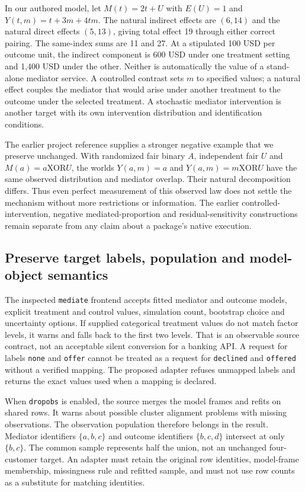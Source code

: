 In our authored model, let $M(t)=2t+U$ with $E(U)=1$ and
$Y(t,m)=t+3m+4tm$. The natural indirect effects are $(6,14)$ and the natural
direct effects $(5,13)$, giving total effect 19 through either correct pairing.
The same-index sums are 11 and 27. At a stipulated 100 USD per outcome unit,
the indirect component is 600 USD under one treatment setting and 1,400 USD
under the other. Neither is automatically the value of a stand-alone mediator
service. A controlled contrast sets $m$ to specified values; a natural effect
couples the mediator that would arise under another treatment to the outcome
under the selected treatment. A stochastic mediator intervention is another
target with its own intervention distribution and identification conditions.
\citep{exec24_mediation_contract}

The earlier project reference supplies a stronger negative example that we
preserve unchanged. With randomized fair binary $A$, independent fair $U$ and
$M(a)=a\mathbin{\mathrm{XOR}}U$, the worlds $Y(a,m)=a$ and
$Y(a,m)=m\mathbin{\mathrm{XOR}}U$ have the same observed distribution and
mediator overlap. Their natural decomposition differs. Thus even perfect
measurement of this observed law does not settle the mechanism without more
restrictions or information. The earlier controlled-intervention, negative
mediated-proportion and residual-sensitivity constructions remain separate
from any claim about a package's native execution.
\citep{exec20_med_reference}

\subsection{Preserve target labels, population and model-object semantics}
The inspected \texttt{mediate} frontend accepts fitted mediator and outcome
models, explicit treatment and control values, simulation count, bootstrap
choice and uncertainty options. If supplied categorical treatment values do
not match factor levels, it warns and falls back to the first two levels.
That is an observable source contract, not an acceptable silent conversion
for a banking API. A request for labels \texttt{none} and \texttt{offer}
cannot be treated as a request for \texttt{declined} and \texttt{offered}
without a verified mapping. The proposed adapter refuses unmapped labels and
returns the exact values used when a mapping is declared.
\citep{exec24_mediation_sources,exec24_mediation_contract}

When \texttt{dropobs} is enabled, the source merges the model frames and refits
on shared rows. It warns about possible cluster alignment problems with
missing observations. The observation population therefore belongs in the
result. Mediator identifiers $\{a,b,c\}$ and outcome identifiers
$\{b,c,d\}$ intersect at only $\{b,c\}$. The common sample represents half
the union, not an unchanged four-customer target. An adapter must retain the
original row identities, model-frame membership, missingness rule and refitted
sample, and must not use row counts as a substitute for matching identities.
\citep{exec24_mediation_sources,exec24_mediation_contract}

